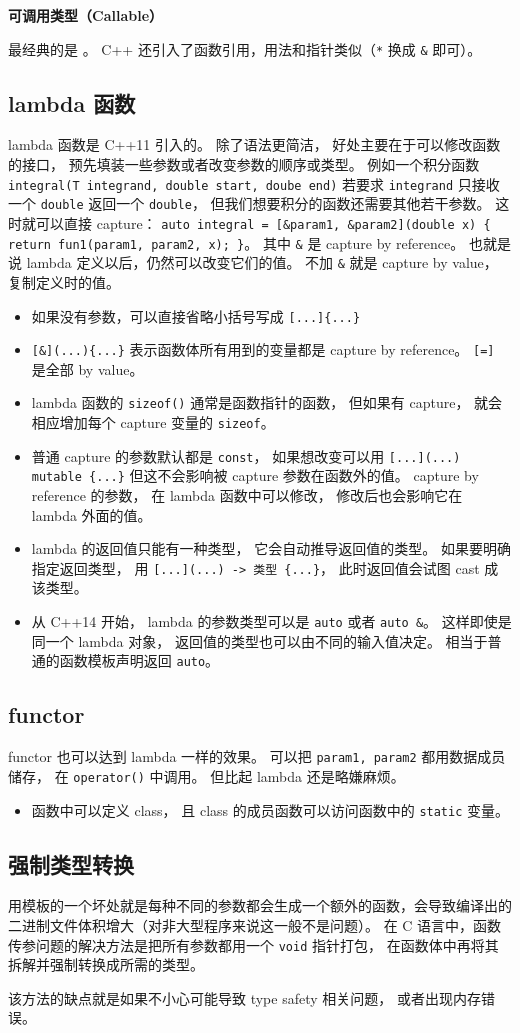 

\textbf{可调用类型（Callable）}

最经典的是 。 C++ 还引入了函数引用，用法和指针类似（\verb`*` 换成 \verb`&` 即可）。

\subsection{lambda 函数}
lambda 函数是 C++11 引入的。 除了语法更简洁， 好处主要在于可以修改函数的接口， 预先填装一些参数或者改变参数的顺序或类型。 例如一个积分函数 \verb`integral(T integrand, double start, doube end)` 若要求 \verb`integrand` 只接收一个 \verb`double` 返回一个 \verb`double`， 但我们想要积分的函数还需要其他若干参数。 这时就可以直接 capture： \verb`auto integral = [&param1, &param2](double x) { return fun1(param1, param2, x); }`。 其中 \verb`&` 是 capture by reference。 也就是说 lambda 定义以后，仍然可以改变它们的值。 不加 \verb`&` 就是 capture by value， 复制定义时的值。

\begin{itemize}
\item 如果没有参数，可以直接省略小括号写成 \verb`[...]{...}`
\item \verb`[&](...){...}` 表示函数体所有用到的变量都是 capture by reference。 \verb`[=]` 是全部 by value。
\item lambda 函数的 \verb`sizeof()` 通常是函数指针的函数， 但如果有 capture， 就会相应增加每个 capture 变量的 \verb`sizeof`。
\item 普通 capture 的参数默认都是 \verb`const`， 如果想改变可以用 \verb`[...](...) mutable {...}` 但这不会影响被 capture 参数在函数外的值。 capture by reference 的参数， 在 lambda 函数中可以修改， 修改后也会影响它在 lambda 外面的值。
\item lambda 的返回值只能有一种类型， 它会自动推导返回值的类型。 如果要明确指定返回类型， 用 \verb`[...](...) -> 类型 {...}`， 此时返回值会试图 cast 成该类型。
\item 从 C++14 开始， lambda 的参数类型可以是 \verb`auto` 或者 \verb`auto &`。 这样即使是同一个 lambda 对象， 返回值的类型也可以由不同的输入值决定。 相当于普通的函数模板声明返回 \verb`auto`。
\end{itemize}

\subsection{functor}
functor 也可以达到 lambda 一样的效果。 可以把 \verb`param1, param2` 都用数据成员储存， 在 \verb`operator()` 中调用。 但比起 lambda 还是略嫌麻烦。

\begin{itemize}
\item 函数中可以定义 class， 且 class 的成员函数可以访问函数中的 \verb`static` 变量。
\end{itemize}

\subsection{强制类型转换}
用模板的一个坏处就是每种不同的参数都会生成一个额外的函数，会导致编译出的二进制文件体积增大（对非大型程序来说这一般不是问题）。 在 C 语言中，函数传参问题的解决方法是把所有参数都用一个 \verb`void` 指针打包， 在函数体中再将其拆解并强制转换成所需的类型。

该方法的缺点就是如果不小心可能导致 type safety 相关问题， 或者出现内存错误。
